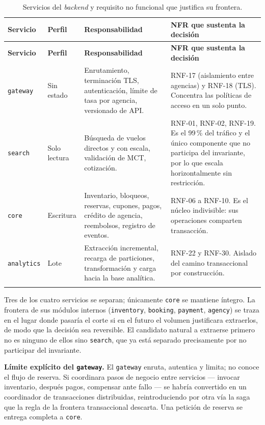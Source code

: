 \documentclass[10pt,letterpaper]{article}
\newcommand{\nota}[1]{%
  \begin{tcolorbox}[colback=cajaFondo,colframe=usaAzul!60,sharp corners=south]#1\end{tcolorbox}}
\begin{document}
\begin{longtable}{@{}L{3.2cm} L{2.0cm} L{4.6cm} L{5.4cm}@{}}
\toprule \textbf{Servicio} & \textbf{Perfil} & \textbf{Responsabilidad} & \textbf{NFR que sustenta la decisión} \\ \midrule \endfirsthead
\toprule \textbf{Servicio} & \textbf{Perfil} & \textbf{Responsabilidad} & \textbf{NFR que sustenta la decisión} \\ \midrule \endhead
\texttt{gateway} & Sin estado & Enrutamiento, terminación TLS, autenticación, límite de tasa por agencia, versionado de API. & RNF-17 (aislamiento entre agencias) y RNF-18 (TLS). Concentra las políticas de acceso en un solo punto. \\
\texttt{search} & Solo lectura & Búsqueda de vuelos directos y con escala, validación de MCT, cotización. & RNF-01, RNF-02, RNF-19. Es el 99\,\% del tráfico y el único componente que no participa del invariante, por lo que escala horizontalmente sin restricción. \\
\texttt{core} & Escritura & Inventario, bloqueos, reservas, cupones, pagos, crédito de agencia, reembolsos, registro de eventos. & RNF-06 a RNF-10. Es el núcleo indivisible: sus operaciones comparten transacción. \\
\texttt{analytics} & Lote & Extracción incremental, recarga de particiones, transformación y carga hacia la base analítica. & RNF-22 y RNF-30. Aislado del camino transaccional por construcción. \\
\bottomrule
\caption{Servicios del \emph{backend} y requisito no funcional que justifica su frontera.}
\end{longtable}

Tres de los cuatro servicios se separan; únicamente \texttt{core} se mantiene íntegro. La frontera de sus módulos internos (\texttt{inventory}, \texttt{booking}, \texttt{payment}, \texttt{agency}) se traza en el lugar donde pasaría el corte si en el futuro el volumen justificara extraerlos, de modo que la decisión sea reversible. El candidato natural a extraerse primero no es ninguno de ellos sino \texttt{search}, que ya está separado precisamente por no participar del invariante.

\nota{\textbf{Límite explícito del \texttt{gateway}.} El \texttt{gateway} enruta, autentica y limita; no conoce el flujo de reserva. Si coordinara pasos de negocio entre servicios --- invocar inventario, después pagos, compensar ante fallo --- se habría convertido en un coordinador de transacciones distribuidas, reintroduciendo por otra vía la saga que la regla de la frontera transaccional descarta. Una petición de reserva se entrega completa a \texttt{core}.}
\end{document}
